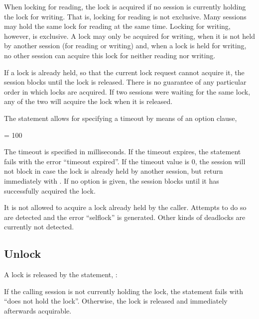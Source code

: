 When locking for reading, the lock is acquired if no session
is currently holding the lock for writing. That is,
locking for reading is not exclusive. Many sessions
may hold the same lock for reading at the same time.
Locking for writing, however, is exclusive.
A lock may only be acquired for writing,
when it is not held by another session
(for reading or writing) and,
when a lock is held for writing, no other session
can acquire this lock for neither reading nor writing.

If a lock is already held, so that the current
lock request cannot acquire it,
the session blocks until the lock is released.
There is no guarantee of any particular order
in which locks are acquired. If two sessions
were waiting for the same lock, any of the two
will acquire the lock when it is released.

The  statement allows for specifying
a timeout by means of an option clause, \eg

  
 = 100

The timeout is specified in milliseconds.
If the timeout expires, the statement fails with
the error ``timeout expired''.
If the timeout value is 0, the session will not block
in case the lock is already held by another session,
but return immediately with .
If no option is given, the session blocks until it
has successfully acquired the lock.

It is not allowed to acquire a lock already held
by the caller. Attempts to do so are detected and
the error ``selflock'' is generated.
Other kinds of deadlocks are currently not detected.

\subsection{Unlock}
A lock is released by the  statement, \eg:

 

If the calling session is not currently holding
the lock, the statement fails with ``does not hold the lock''.
Otherwise, the lock is released and immediately
afterwards acquirable.


